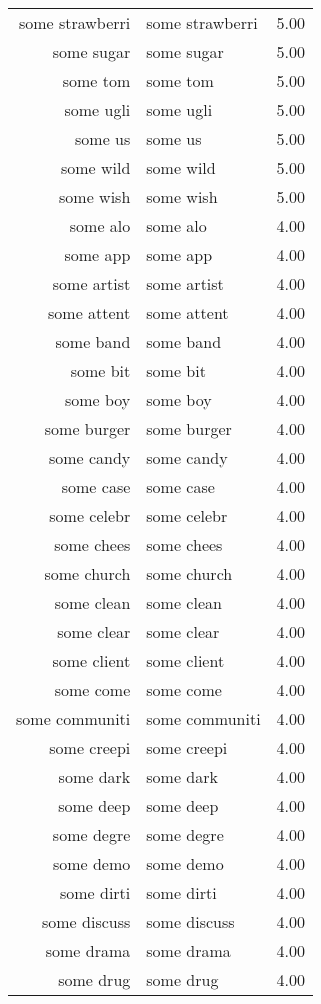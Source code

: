 \begin{table}[ht]
\begin{tabular}{rlr}
  some strawberri & some strawberri & 5.00 \\ 
  some sugar & some sugar & 5.00 \\ 
  some tom & some tom & 5.00 \\ 
  some ugli & some ugli & 5.00 \\ 
  some us & some us & 5.00 \\ 
  some wild & some wild & 5.00 \\ 
  some wish & some wish & 5.00 \\ 
  some alo & some alo & 4.00 \\ 
  some app & some app & 4.00 \\ 
  some artist & some artist & 4.00 \\ 
  some attent & some attent & 4.00 \\ 
  some band & some band & 4.00 \\ 
  some bit & some bit & 4.00 \\ 
  some boy & some boy & 4.00 \\ 
  some burger & some burger & 4.00 \\ 
  some candy & some candy & 4.00 \\ 
  some case & some case & 4.00 \\ 
  some celebr & some celebr & 4.00 \\ 
  some chees & some chees & 4.00 \\ 
  some church & some church & 4.00 \\ 
  some clean & some clean & 4.00 \\ 
  some clear & some clear & 4.00 \\ 
  some client & some client & 4.00 \\ 
  some come & some come & 4.00 \\ 
  some communiti & some communiti & 4.00 \\ 
  some creepi & some creepi & 4.00 \\ 
  some dark & some dark & 4.00 \\ 
  some deep & some deep & 4.00 \\ 
  some degre & some degre & 4.00 \\ 
  some demo & some demo & 4.00 \\ 
  some dirti & some dirti & 4.00 \\ 
  some discuss & some discuss & 4.00 \\ 
  some drama & some drama & 4.00 \\ 
  some drug & some drug & 4.00 \\ 

\end{tabular}
\end{table}
